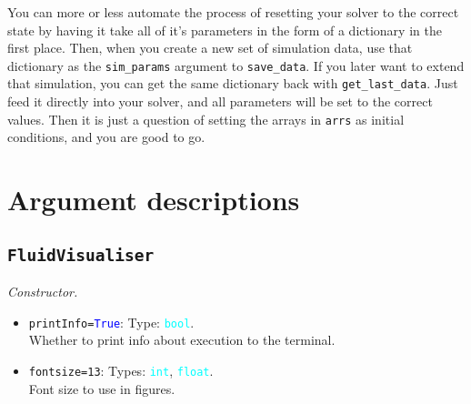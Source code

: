 \documentclass{article}
\newcommand{\ttt}[1]{\texttt{#1}}
\newcommand{\ptype}[1]{\texttt{\textcolor{cyan}{#1}}}
\newcommand{\cbl}[1]{\textcolor{blue}{#1}}
\newcommand{\cro}[1]{\textcolor{RedOrange}{#1}}
\begin{document}
You can more or less automate the process of resetting your solver to the correct state by having it take all of it's parameters in the form of a dictionary in the first place. Then, when you create a new set of simulation data, use that dictionary as the \ttt{sim\_params} argument to \ttt{save\_data}. If you later want to extend that simulation, you can get the same dictionary back with \ttt{get\_last\_data}. Just feed it directly into your solver, and all parameters will be set to the correct values. Then it is just a question of setting the arrays in \ttt{arrs} as initial conditions, and you are good to go.

\section{Argument descriptions}
\label{sec:margs}
\subsection{\ttt{FluidVisualiser}}
\label{sec:const}
\textit{Constructor.}
\begin{itemize}
	\item \ttt{\cro{printInfo}=\cbl{True}}: Type: \ptype{bool}.\\Whether to print info about execution to the terminal.
	\item \ttt{\cro{fontsize}=13}: Types: \ptype{int}, \ptype{float}.\\Font size to use in figures.
\end{itemize}
\end{document}
